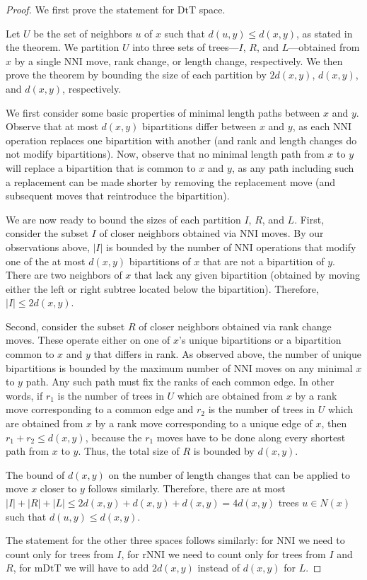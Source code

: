 \documentclass{amsart}
\newcommand{\dts}{\mathrm{DtT}}
\newcommand{\nni}{\mathrm{NNI}}
\newcommand{\rnni}{\mathrm{rNNI}}
\newcommand{\mdts}{\mathrm{mDtT}}
\begin{document}
\begin{proof}
We first prove the statement for $\dts$ space.

Let $U$ be the set of neighbors $u$ of $x$ such that $d(u,y) \le d(x,y)$, as stated in the theorem.
We partition $U$ into three sets of trees---$I$, $R$, and $L$---obtained from $x$ by a single NNI move, rank change, or length change, respectively.
We then prove the theorem by bounding the size of each partition by $2d(x,y)$, $d(x,y)$, and $d(x,y)$, respectively.

We first consider some basic properties of minimal length paths between $x$ and $y$.
Observe that at most $d(x,y)$ bipartitions differ between $x$ and $y$, as each NNI operation replaces one bipartition with another (and rank and length changes do not modify bipartitions).
Now, observe that no minimal length path from $x$ to $y$ will replace a bipartition that is common to $x$ and $y$, as any path including such a replacement can be made shorter by removing the replacement move (and subsequent moves that reintroduce the bipartition).

We are now ready to bound the sizes of each partition $I$, $R$, and $L$.
First, consider the subset $I$ of closer neighbors obtained via NNI moves.
By our observations above, $|I|$ is bounded by the number of NNI operations that modify one of the at most $d(x,y)$ bipartitions of $x$ that are not a bipartition of $y$.
There are two neighbors of $x$ that lack any given bipartition (obtained by moving either the left or right subtree located below the bipartition).
Therefore, $|I| \le 2d(x,y)$.

Second, consider the subset $R$ of closer neighbors obtained via rank change moves.
These operate either on one of $x$'s unique bipartitions or a bipartition common to $x$ and $y$ that differs in rank.
As observed above, the number of unique bipartitions is bounded by the maximum number of NNI moves on any minimal $x$ to $y$ path.
Any such path must fix the ranks of each common edge.
In other words, if $r_1$ is the number of trees in $U$ which are obtained from $x$ by a rank move corresponding to a common edge and $r_2$ is the number of trees in $U$ which are obtained from $x$ by a rank move corresponding to a unique edge of $x$, then $r_1 + r_2 \leq d(x,y)$, because the $r_1$ moves have to be done along every shortest path from $x$ to $y$.
Thus, the total size of $R$ is bounded by $d(x,y)$.

The bound of $d(x,y)$ on the number of length changes that can be applied to move $x$ closer to $y$ follows similarly.
Therefore, there are at most $|I| + |R| + |L| \le 2d(x,y) + d(x,y) + d(x,y) = 4d(x,y)$ trees $u \in N(x)$ such that $d(u, y) \le d(x, y)$.

The statement for the other three spaces follows similarly: for $\nni$ we need to count only for trees from $I$, for $\rnni$ we need to count only for trees from $I$ and $R$, for $\mdts$ we will have to add $2d(x,y)$ instead of $d(x,y)$ for $L$.
\end{proof}
\end{document}
